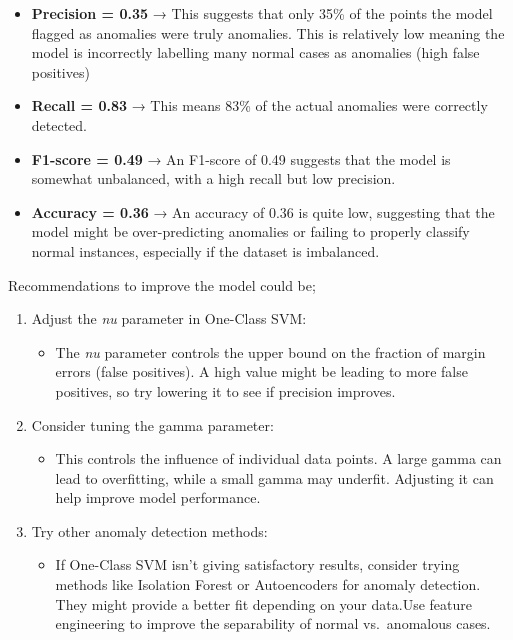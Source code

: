 \documentclass[11pt]{article}
\providecommand{\tightlist}{%
      \setlength{\itemsep}{0pt}\setlength{\parskip}{0pt}}
\begin{document}
\begin{itemize}
\tightlist
\item
  \textbf{Precision = 0.35} → This suggests that only 35\% of the points
  the model flagged as anomalies were truly anomalies. This is
  relatively low meaning the model is incorrectly labelling many normal
  cases as anomalies (high false positives)
\item
  \textbf{Recall = 0.83} → This means 83\% of the actual anomalies were
  correctly detected.
\item
  \textbf{F1-score = 0.49} → An F1-score of 0.49 suggests that the model
  is somewhat unbalanced, with a high recall but low precision.
\item
  \textbf{Accuracy = 0.36} → An accuracy of 0.36 is quite low,
  suggesting that the model might be over-predicting anomalies or
  failing to properly classify normal instances, especially if the
  dataset is imbalanced.
\end{itemize}

Recommendations to improve the model could be;

\begin{enumerate}
\def\labelenumi{\arabic{enumi}.}
\tightlist
\item
  Adjust the \emph{nu} parameter in One-Class SVM:

  \begin{itemize}
  \tightlist
  \item
    The \emph{nu} parameter controls the upper bound on the fraction of
    margin errors (false positives). A high value might be leading to
    more false positives, so try lowering it to see if precision
    improves.
  \end{itemize}
\item
  Consider tuning the gamma parameter:

  \begin{itemize}
  \tightlist
  \item
    This controls the influence of individual data points. A large gamma
    can lead to overfitting, while a small gamma may underfit. Adjusting
    it can help improve model performance.
  \end{itemize}
\item
  Try other anomaly detection methods:

  \begin{itemize}
  \tightlist
  \item
    If One-Class SVM isn't giving satisfactory results, consider trying
    methods like Isolation Forest or Autoencoders for anomaly detection.
    They might provide a better fit depending on your data.Use feature
    engineering to improve the separability of normal vs.~anomalous
    cases.
  \end{itemize}
\end{enumerate}
\end{document}
